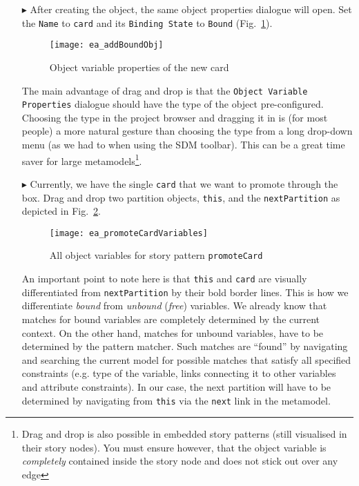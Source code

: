 \begin{itemize}
\vspace{0.5cm}

\item[$\blacktriangleright$] After creating the object, the same object properties dialogue will open.  Set the \texttt{Name} to \texttt{card} and its
\texttt{Binding State} to \texttt{Bound} (Fig.~\ref{fig:sdm_new_card_properties}).

\newpage

\begin{figure}[htbp]
\begin{center}
  \texttt{[image: ea\_addBoundObj]}
  \caption{Object variable properties of the new card}
  \label{fig:sdm_new_card_properties}
\end{center}
\end{figure}

The main advantage of drag and drop is that the \texttt{Object Variable Pro\-per\-ties} dialogue should have the type of the object pre-configured. Choosing
the type in the project browser and dragging it in is (for most people) a more natural gesture than choosing the type from a long drop-down menu (as we had to
when using the SDM toolbar). This can be a great time saver for large metamodels\footnote{Drag and drop is also possible in embedded story patterns
(still visualised in their story nodes).  You must ensure however, that the object variable is \emph{completely} contained inside the story node and does not
stick out over any edge}.

\vspace{0.5cm}

\item[$\blacktriangleright$] Currently, we have the single \texttt{card} that we want to promote through the box. Drag and drop two partition objects,
\texttt{this}, and the \texttt{nextPartition} as depicted in Fig.~\ref{fig:sdm_check_complete_sp}.

\begin{figure}[htbp]
\begin{center}
  \texttt{[image: ea\_promoteCardVariables]}
  \caption{All object variables for story pattern \texttt{promoteCard}}
  \label{fig:sdm_check_complete_sp}
\end{center}
\end{figure}

\vspace{0.5cm}

An important point to note here is that \texttt{this} and \texttt{card} are visually differentiated from \texttt{nextPartition} by
their bold border lines. This is how we differentiate \emph{bound} from \emph{unbound} (\emph{free}) variables. We already know that matches for bound
variables are completely determined by the current context. On the other hand, matches for unbound variables, have to be determined by the pattern matcher. Such
matches are ``found'' by navigating and searching the current model for possible matches that satisfy all specified constraints (e.g. type of the variable,
links connecting it to other variables and attribute constraints). In our case, the next partition will have to be determined by navigating from \texttt{this}
via the \texttt{next} link in the metamodel.


\end{itemize}
